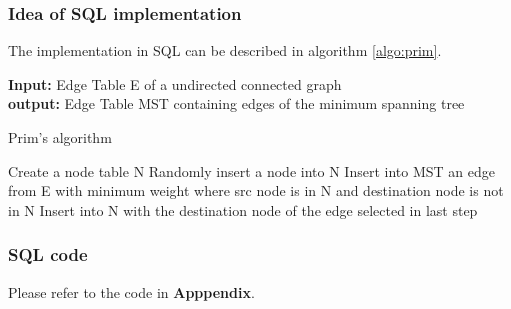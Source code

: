 \subsubsection{Idea of SQL implementation}
The implementation in SQL can be described in algorithm \ref{algo:prim}.
 
\begin{algorithm}
{\bf Input:} Edge Table E of a undirected connected graph \\
{\bf output:} Edge Table MST containing edges of the minimum spanning tree
\begin{algorithmic}
\caption{Prim's algorithm}
\STATE Create a node table N
\STATE Randomly insert a node into N
	\STATE Insert into MST an edge from E with minimum weight where src node is in N and destination node is not in N
	\STATE Insert into N with the destination node of the edge selected in last step
\ENDFOR
\end{algorithmic}
\label{algo:prim}
\end{algorithm}

\subsubsection{SQL code}
Please refer to the code in {\bf Apppendix}.



